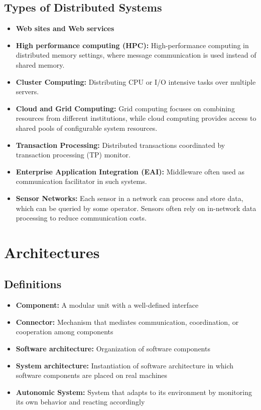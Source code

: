 \documentclass[12pt,titlepage]{article}
\begin{document}
      \subsection{Types of Distributed Systems}
        \begin{itemize}
          \item \textbf{Web sites and Web services}
          \item \textbf{High performance computing (HPC):} High-performance computing in distributed memory settings, where message communication is used instead of shared memory.
          \item \textbf{Cluster Computing:} Distributing CPU or I/O intensive tasks over multiple servers.
          \item \textbf{Cloud and Grid Computing:} Grid computing focuses on combining resources from different institutions, while cloud computing provides access to shared pools
          of configurable system resources.
          \item \textbf{Transaction Processing:} Distributed transactions coordinated by transaction processing (TP) monitor.
          \item \textbf{Enterprise Application Integration (EAI):} Middleware often used as communication facilitator in such systems.
          \item \textbf{Sensor Networks:} Each sensor in a network can process and store data, which can be queried by some operator. Sensors often rely on in-network data
          processing to reduce communication costs.
        \end{itemize}

  \newpage

  \section{Architectures}
    \subsection{Definitions}
      \begin{itemize}
        \item \textbf{Component:} A modular unit with a well-defined interface
        \item \textbf{Connector:} Mechanism that mediates communication, coordination, or cooperation among components
        \item \textbf{Software architecture:} Organization of software components
        \item \textbf{System architecture:} Instantiation of software architecture in which software components are placed on real machines
        \item \textbf{Autonomic System:} System that adapts to its environment by monitoring its own behavior and reacting accordingly
      \end{itemize}
\end{document}
